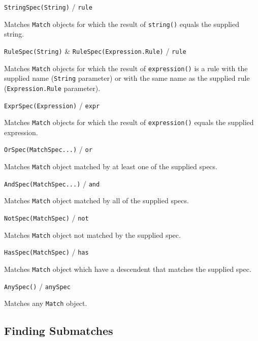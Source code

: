 \begin{description}
\item \texttt{StringSpec(String)} / \texttt{rule}

  Matches \texttt{Match} objects for which the result of \texttt{string()}
  equals the supplied string.

\item \texttt{RuleSpec(String)} \& \texttt{RuleSpec(Expression.Rule)} /
  \texttt{rule}

  Matches \texttt{Match} objects for which the result of \texttt{expression()}
  is a rule with the supplied name (\texttt{String} parameter) or with the same
  name as the supplied rule (\texttt{Expression.Rule} parameter).

\item \texttt{ExprSpec(Expression)} / \texttt{expr}

  Matches \texttt{Match} objects for which the result of \texttt{expression()}
  equals the supplied expression.

\item \texttt{OrSpec(MatchSpec...)} / \texttt{or}

  Matches \texttt{Match} object matched by at least one of the supplied specs.

\item \texttt{AndSpec(MatchSpec...)} / \texttt{and}

  Matches \texttt{Match} object matched by all of the supplied specs.

\item \texttt{NotSpec(MatchSpec)} / \texttt{not}

  Matches \texttt{Match} object not matched by the supplied spec.

\item \texttt{HasSpec(MatchSpec)} / \texttt{has}

  Matches \texttt{Match} object which have a descendent that matches the
  supplied spec.

\item \texttt{AnySpec()} / \texttt{anySpec}

  Matches any \texttt{Match} object.

\end{description}

\subsection{Finding Submatches}
\label{finding_submatches}

